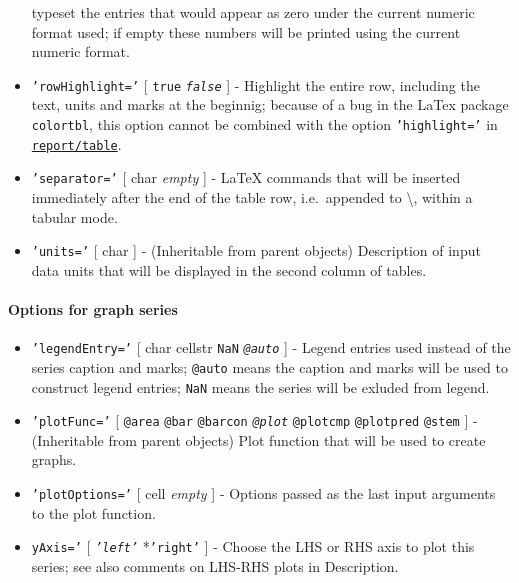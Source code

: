 \begin{itemize}
  typeset the entries that would appear as zero under the current
  numeric format used; if empty these numbers will be printed using the
  current numeric format.
\item
  \texttt{'rowHighlight='} {[} \texttt{true} \textbar{}
  \emph{\texttt{false}} {]} - Highlight the entire row, including the
  text, units and marks at the beginnig; because of a bug in the LaTex
  package \texttt{colortbl}, this option cannot be combined with the
  option \texttt{'highlight='} in
  \href{report/table}{\texttt{report/table}}.
\item
  \texttt{'separator='} {[} char \textbar{} \emph{empty} {]} - LaTeX
  commands that will be inserted immediately after the end of the table
  row, i.e.~appended to \textbackslash{}, within a tabular mode.
\item
  \texttt{'units='} {[} char {]} - (Inheritable from parent objects)
  Description of input data units that will be displayed in the second
  column of tables.
\end{itemize}

\paragraph{Options for graph series}\label{options-for-graph-series}

\begin{itemize}
\item
  \texttt{'legendEntry='} {[} char \textbar{} cellstr \textbar{}
  \texttt{NaN} \textbar{} \emph{\texttt{@auto}} {]} - Legend entries
  used instead of the series caption and marks; \texttt{@auto} means the
  caption and marks will be used to construct legend entries;
  \texttt{NaN} means the series will be exluded from legend.
\item
  \texttt{'plotFunc='} {[} \texttt{@area} \textbar{} \texttt{@bar}
  \textbar{} \texttt{@barcon} \textbar{} \emph{\texttt{@plot}}
  \textbar{} \texttt{@plotcmp} \textbar{} \texttt{@plotpred} \textbar{}
  \texttt{@stem} {]} - (Inheritable from parent objects) Plot function
  that will be used to create graphs.
\item
  \texttt{'plotOptions='} {[} cell \textbar{} \emph{empty} {]} - Options
  passed as the last input arguments to the plot function.
\item
  \texttt{yAxis='} {[} \emph{\texttt{'left'}} \textbar{}
  *\texttt{'right'} {]} - Choose the LHS or RHS axis to plot this
  series; see also comments on LHS-RHS plots in Description.
\end{itemize}

